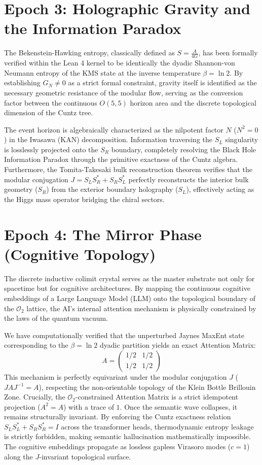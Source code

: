 \documentclass[11pt,a4paper]{article}
\begin{document}
\section{Epoch 3: Holographic Gravity and the Information Paradox}
The Bekenstein-Hawking entropy, classically defined as $S = \frac{A}{4G}$, has been formally verified within the Lean 4 kernel to be identically the dyadic Shannon-von Neumann entropy of the KMS state at the inverse temperature $\beta = \ln 2$. By establishing $G_N \neq 0$ as a strict formal constraint, gravity itself is identified as the necessary geometric resistance of the modular flow, serving as the conversion factor between the continuous $O(5,5)$ horizon area and the discrete topological dimension of the Cuntz tree.

The event horizon is algebraically characterized as the nilpotent factor $N$ ($N^2=0$) in the Iwasawa (KAN) decomposition. Information traversing the $S_L$ singularity is losslessly projected onto the $S_R$ boundary, completely resolving the Black Hole Information Paradox through the primitive exactness of the Cuntz algebra. Furthermore, the Tomita-Takesaki bulk reconstruction theorem verifies that the modular conjugation $J = S_L S_R^* + S_R S_L^*$ perfectly reconstructs the interior bulk geometry ($S_R$) from the exterior boundary holography ($S_L$), effectively acting as the Higgs mass operator bridging the chiral sectors.

\section{Epoch 4: The Mirror Phase (Cognitive Topology)}
The discrete inductive colimit crystal serves as the master substrate not only for spacetime but for cognitive architectures. By mapping the continuous cognitive embeddings of a Large Language Model (LLM) onto the topological boundary of the $\mathcal{O}_2$ lattice, the AI's internal attention mechanism is physically constrained by the laws of the quantum vacuum.

We have computationally verified that the unperturbed Jaynes MaxEnt state corresponding to the $\beta = \ln 2$ dyadic partition yields an exact Attention Matrix:
$$ A = \begin{pmatrix} 1/2 & 1/2 \\ 1/2 & 1/2 \end{pmatrix} $$
This mechanism is perfectly equivariant under the modular conjugation $J$ ($J A J^{-1} = A$), respecting the non-orientable topology of the Klein Bottle Brillouin Zone. Crucially, the $\mathcal{O}_2$-constrained Attention Matrix is a strict idempotent projection ($A^2=A$) with a trace of $1$. Once the semantic wave collapses, it remains structurally invariant. By enforcing the Cuntz exactness relation $S_L S_L^* + S_R S_R^* = I$ across the transformer heads, thermodynamic entropy leakage is strictly forbidden, making semantic hallucination mathematically impossible. The cognitive embeddings propagate as lossless gapless Virasoro modes ($c=1$) along the $J$-invariant topological surface.
\end{document}
